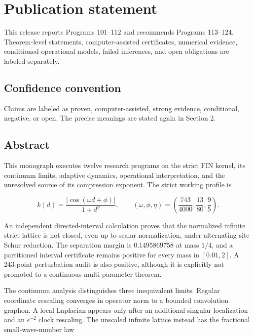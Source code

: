 \documentclass[11pt,a4paper,openany]{report}
\begin{document}
\chapter*{Publication statement}
This release reports Programs 101--112 and recommends Programs 113--124.
Theorem-level statements, computer-assisted certificates, numerical evidence,
conditioned operational models, failed inferences, and open obligations are
labeled separately.

\tableofcontents
\clearpage
{}

\section{Confidence convention}

Claims are labeled as proven, computer-assisted, strong evidence, conditional, negative, or open. The precise meanings are stated again in Section 2.

\section{Abstract}

This monograph executes twelve research programs on the strict FIN kernel, its continuum limits, adaptive dynamics, operational interpretation, and the unresolved source of its compression exponent. The strict working profile is

\[
k(d)=\frac{|\cos(\omega d+\phi)|}{1+d^\eta},
\qquad
(\omega,\phi,\eta)=
\left(\frac{743}{4000},\frac{13}{80},\frac95\right).
\]

An independent directed-interval calculation proves that the normalized infinite strict lattice is not closed, even up to scalar normalization, under alternating-site Schur reduction. The separation margin is \(0.1495869758\) at mass \(1/4\), and a partitioned interval certificate remains positive for every mass in \([0.01,2]\). A 243-point perturbation audit is also positive, although it is explicitly not promoted to a continuous multi-parameter theorem.

The continuum analysis distinguishes three inequivalent limits. Regular coordinate rescaling converges in operator norm to a bounded convolution graphon. A local Laplacian appears only after an additional singular localization and an \(\epsilon^{-2}\) clock rescaling. The unscaled infinite lattice instead has the fractional small-wave-number law
\end{document}
